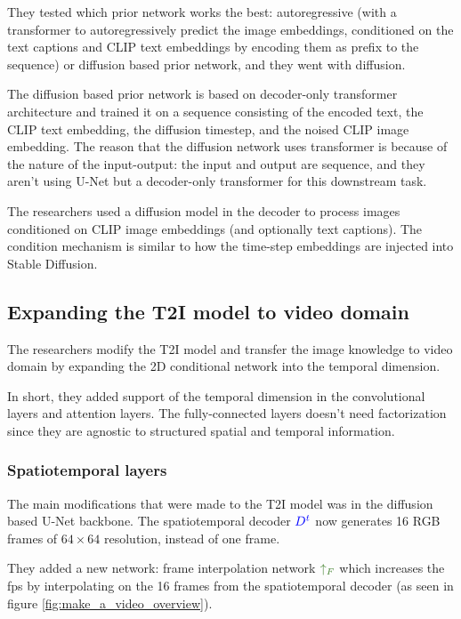 They tested which prior network works the best: autoregressive (with a transformer to autoregressively predict the image embeddings, conditioned on the text captions and CLIP text embeddings by encoding them as prefix to the sequence) or diffusion based prior network, and they went with diffusion. 

The diffusion based prior network is based on decoder-only transformer architecture and trained it on a sequence consisting of the encoded text, the CLIP text embedding, the diffusion timestep, and the noised CLIP image embedding. The reason that the diffusion network uses transformer is because of the nature of the input-output: the input and output are sequence, and they aren't using U-Net but a decoder-only transformer for this downstream task.

The researchers used a diffusion model in the decoder to process images conditioned on CLIP image embeddings (and optionally text captions). The condition mechanism is similar to how the time-step embeddings are injected into Stable Diffusion.







\subsection{Expanding the T2I model to video domain}

The researchers modify the T2I model and transfer the image knowledge to video domain by expanding the 2D conditional network into the temporal dimension.

In short, they added support of the temporal dimension in the convolutional layers and attention layers. The fully-connected layers doesn't need factorization since they are agnostic to structured spatial and temporal information.

\subsubsection{Spatiotemporal layers}

The main modifications that were made to the T2I model was in the diffusion based U-Net backbone. The spatiotemporal decoder $\textcolor{blue}{D^t}$ now generates 16 RGB frames of $64\times 64$ resolution, instead of one frame.

They added a new network: frame interpolation network $\textcolor{OliveGreen}{\uparrow_F}$ which increases the fps by interpolating on the 16 frames from the spatiotemporal decoder (as seen in figure \ref{fig:make_a_video_overview}).

